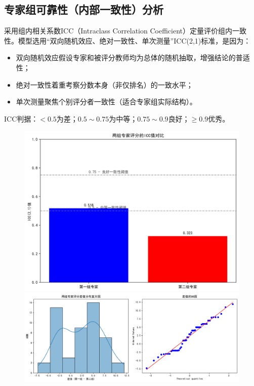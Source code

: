 \subsection{专家组可靠性（内部一致性）分析}
采用组内相关系数ICC（Intraclass Correlation Coefficient）定量评价组内一致性。模型选用“双向随机效应、绝对一致性、单次测量”ICC(2,1)标准，是因为：

\begin{itemize}
    \item 双向随机效应假设专家和被评分教师均为总体的随机抽取，增强结论的普适性；
    \item 绝对一致性着重考察分数本身（非仅排名）的一致水平；
    \item 单次测量聚焦个别评分者一致性（适合专家组实际结构）。
\end{itemize}

ICC判据：$<0.5$为差；$0.5{\sim}0.75$为中等；$0.75{\sim}0.9$良好；$\geq0.9$优秀。

\begin{figure}[H]
    \centering
    \begin{minipage}[t]{0.5\textwidth}
        \centering
        \includegraphics[width=1\textwidth]{icc_analysis.png}
    \end{minipage}
    \hfill
    \begin{minipage}[t]{1\textwidth}
        \centering
        \includegraphics[width=1\textwidth]{normality_test.png}
    \end{minipage}
\end{figure}


